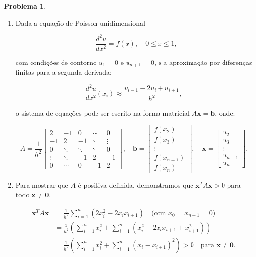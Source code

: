 \documentclass{article}
\theoremstyle{plain}
\theoremstyle{definition}
\newtheorem{prblm}[defn]{Problema}
\theoremstyle{remark}
\begin{document}
\begin{prblm}
  \begin{enumerate}
  \item [(a)]
    Dada a equação de Poisson unidimensional

    \begin{equation}
      -\frac{d^2u}{dx^2} = f(x), \quad 0 \leq x \leq 1,
    \end{equation}

    \noindent com condições de contorno \(u_1 = 0\) e \(u_{n+1} = 0\), e a aproximação por diferenças finitas para a segunda derivada:

    \begin{equation}
      \frac{d^2u}{dx^2}(x_i) \approx \frac{u_{i-1} - 2u_i + u_{i+1}}{h^2},
    \end{equation}

    \noindent o sistema de equações pode ser escrito na forma matricial \(A\mathbf{x} = \mathbf{b}\), onde:

    \[
    A = \frac{1}{h^2}
    \begin{bmatrix}
      2 & -1 & 0 & \cdots & 0 \\
      -1 & 2 & -1 & \ddots & \vdots \\
      0 & \ddots & \ddots & \ddots & 0 \\
      \vdots & \ddots & -1 & 2 & -1 \\
      0 & \cdots & 0 & -1 & 2
      \end{bmatrix}, \quad
      \mathbf{b} =
    \begin{bmatrix}
      f(x_2) \\
      f(x_3) \\
      \vdots \\
      f(x_{n-1}) \\
      f(x_n)
    \end{bmatrix}, \quad
    \mathbf{x} =
    \begin{bmatrix}
      u_2 \\
      u_3 \\
      \vdots \\
      u_{n-1} \\
      u_n
    \end{bmatrix}.
    \]

    \item [(b)]
    Para mostrar que \(A\) é positiva definida, demonstramos que \(\mathbf{x}^T A \mathbf{x} > 0\) para todo \(\mathbf{x} \neq \mathbf{0}\).

    \begin{align*}
    \mathbf{x}^T A \mathbf{x} &= \frac{1}{h^2} \sum_{i=1}^n \left(2x_i^2 - 2x_i x_{i+1}\right) \quad \text{(com \(x_0 = x_{n+1} = 0\))} \\
    &= \frac{1}{h^2} \left( \sum_{i=1}^n x_i^2 + \sum_{i=1}^n (x_i^2 - 2x_i x_{i+1} + x_{i+1}^2) \right) \\
    &= \frac{1}{h^2} \left( \sum_{i=1}^n x_i^2 + \sum_{i=1}^n (x_i - x_{i+1})^2 \right) > 0 \quad \text{para \(\mathbf{x} \neq \mathbf{0}\)}.
    \end{align*}


\end{enumerate}
\end{prblm}
\end{document}
